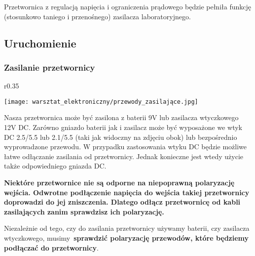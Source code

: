 \documentclass{pdfBooklets}
\begin{document}
Przetwornica z regulacją napięcia i ograniczenia prądowego będzie pełniła funkcję (stosunkowo taniego i przenośnego) zasilacza laboratoryjnego.

\subsection{Uruchomienie}
\subsubsection{Zasilanie przetwornicy}

\begin{wrapfigure}{r}{0.35\textwidth}
  \begin{center}
    \vspace{-40pt}
    \texttt{[image: warsztat\_elektroniczny/przewody\_zasilające.jpg]}
    \vspace{-40pt}
  \end{center}
\end{wrapfigure}


Nasza przetwornica może być zasilona z baterii 9V lub zasilacza wtyczkowego 12V DC.
Zarówno gniazdo baterii jak i zasilacz może być wyposażone we wtyk DC 2.5/5.5 lub 2.1/5.5 (taki jak widoczny na zdjęciu obok) lub bezpośrednio wyprowadzone przewodu.
W przypadku zastosowania wtyku DC będzie możliwe łatwe odłączanie zasilania od przetwornicy. Jednak konieczne jest wtedy użycie także odpowiedniego gniazda DC.

\begin{ProTip}{}
  \textbf{Niektóre przetwornice nie są odporne na niepoprawną polaryzację wejścia. Odwrotne podłączenie napięcia do wejścia takiej przetwornicy doprowadzi do jej zniszczenia. Dlatego odłącz przetwornicę od kabli zasilających zanim sprawdzisz ich polaryzację.}
\end{ProTip}

\vspace{13pt}\noindent
Niezależnie od tego, czy do zasilania przetwornicy używamy baterii, czy zasilacza wtyczkowego, musimy~\textbf{sprawdzić
  polaryzację przewodów, które będziemy podłączać do przetwornicy}. 
\\
\end{document}
